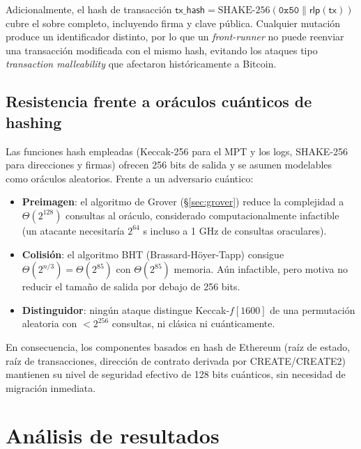 Adicionalmente, el hash de transacción $\textsf{tx\_hash} = \text{SHAKE-256}(\texttt{0x50} \| \textsf{rlp}(\textsf{tx}))$ cubre el sobre completo, incluyendo firma y clave pública. Cualquier mutación produce un identificador distinto, por lo que un \emph{front-runner} no puede reenviar una transacción modificada con el mismo hash, evitando los ataques tipo \emph{transaction malleability} que afectaron históricamente a Bitcoin.

\subsection{Resistencia frente a oráculos cuánticos de hashing}

Las funciones hash empleadas (Keccak-256 para el MPT y los logs, SHAKE-256 para direcciones y firmas) ofrecen 256 bits de salida y se asumen modelables como oráculos aleatorios. Frente a un adversario cuántico:

\begin{itemize}
  \item \textbf{Preimagen}: el algoritmo de Grover (\S\ref{sec:grover}) reduce la complejidad a $\Theta(2^{128})$ consultas al oráculo, considerado computacionalmente infactible (un atacante necesitaría $2^{64}$ s incluso a 1 GHz de consultas oraculares).
  
  \item \textbf{Colisión}: el algoritmo BHT (Brassard-Höyer-Tapp) consigue $\Theta(2^{n/3}) = \Theta(2^{85})$ con $\Theta(2^{85})$ memoria. Aún infactible, pero motiva no reducir el tamaño de salida por debajo de 256 bits.
  
  \item \textbf{Distinguidor}: ningún ataque distingue Keccak-$f[1600]$ de una permutación aleatoria con $< 2^{256}$ consultas, ni clásica ni cuánticamente.
\end{itemize}

En consecuencia, los componentes basados en hash de Ethereum (raíz de estado, raíz de transacciones, dirección de contrato derivada por CREATE/CREATE2) mantienen su nivel de seguridad efectivo de 128 bits cuánticos, sin necesidad de migración inmediata.


\section{Análisis de resultados}
\label{sec:res_analysis}

